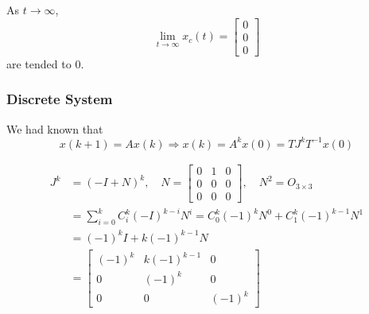 \documentclass[12pt,a4paper]{article}
\begin{document}
As $t\to\infty$, 
\[
\lim_{t \to \infty} x_c(t) = \begin{bmatrix}
	0 \\ 0 \\ 0
\end{bmatrix}
\]
are tended to $0$.


\vspace{1cm}
\subsubsection*{Discrete System}

We had known that
\[
x(k + 1) = Ax(k) \Rightarrow x(k) = A^k x(0) = TJ^kT^{-1} x(0)
\]

\begin{align*}
	J^k &= (-I + N)^k , \quad N = \begin{bmatrix}
		0 & 1 & 0 \\
		0 & 0 & 0 \\
		0 & 0 & 0
	\end{bmatrix}, \quad N^2 = O_{3\times3} \\
	&= \sum_{i = 0}^k C_{i}^k (-I)^{k - i} N^i = C_0^k (-1)^k N^0 + C_1^k (-1)^{k - 1}N^1 \\
	&= (-1)^k I + k (-1)^{k - 1} N \\
	&= \begin{bmatrix}
		(-1)^k & k(-1)^{k - 1} & 0 \\
		0 & (-1)^k & 0 \\
		0 & 0 & (-1)^k
	\end{bmatrix} 
\end{align*}
\end{document}
